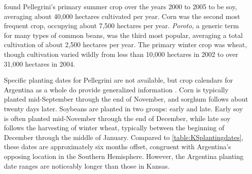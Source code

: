 \textcite{volante2005analisis} found Pellegrini's primary summer crop over the years 2000 to 2005 to be soy, averaging about 40,000 hectares cultivated per year. Corn was the second most frequent crop, occupying about 7,500 hectares per year. \textit{Poroto}, a generic term for many types of common beans, was the third most popular, averaging a total cultivation of about 2,500 hectares per year. The primary winter crop was wheat, though cultivation varied wildly from less than 10,000 hectares in 2002 to over 31,000 hectares in 2004.

Specific planting dates for Pellegrini are not available, but crop calendars for Argentina as a whole do provide generalized information \autocites{agriculture-for2008foreign}{sacks2010crop}{soybean-and-cor2013argentina}. Corn is typically planted mid-September through the end of November, and sorghum follows about twenty days later. Soybeans are planted in two groups: early and late. Early soy is often planted mid-November through the end of December, while late soy follows the harvesting of winter wheat, typically between the beginning of December through the middle of January. Compared to \autoref{table:KSplantingdates}, these dates are approximately six months offset, congruent with Argentina's opposing location in the Southern Hemisphere. However, the Argentina planting date ranges are noticeably longer than those in Kansas.

